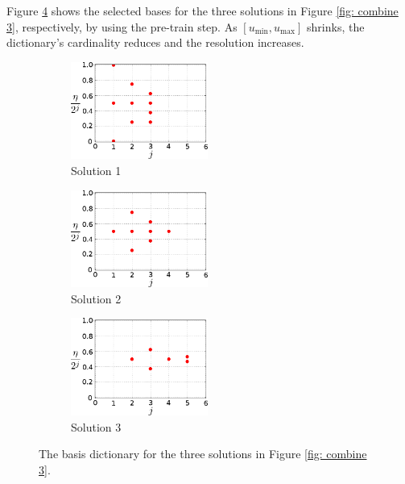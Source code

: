 Figure \ref{fig: basis pnt} shows the selected bases
for the three solutions in Figure \ref{fig: combine 3}, respectively, by using
the pre-train step.
As $\left[u_{\min}, u_{\max}\right]$ shrinks, the dictionary's cardinality reduces and
the resolution increases. \\

\begin{figure}[htbp]\begin{center}
    \begin{subfigure}[t]{.32\textwidth}
        \centering
        \includegraphics[width=4.5cm]{../basis_pnt_1.png}
        \caption{Solution 1}
        \label{fig: basis pnt 1}
    \end{subfigure}
    \begin{subfigure}[t]{.32\textwidth}     
        \centering
        \includegraphics[width=4.5cm]{../basis_pnt_2.png}
        \caption{Solution 2}
        \label{fig: basis pnt 2}
    \end{subfigure}
    \begin{subfigure}[t]{.32\textwidth}
        \centering
        \includegraphics[width=4.5cm]{../basis_pnt_3.png}
        \caption{Solution 3}
        \label{fig: basis pnt 3}
    \end{subfigure}
    \caption{The basis dictionary for the three solutions in Figure \ref{fig: combine 3}.}
    \label{fig: basis pnt}
\end{center}\end{figure}

